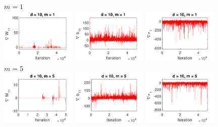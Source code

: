 \documentclass[10pt]{article}
\begin{document}
\begin{figure}[p!]
\centering
$m=1$ \\
\includegraphics[width=0.32\textwidth,trim={0 23 0 11.5},clip]{images/bananaND_usivi_gW11_d10_m1.pdf}
\includegraphics[width=0.32\textwidth,trim={0 23 0 11.5},clip]{images/bananaND_usivi_gb11_d10_m1.pdf}
\includegraphics[width=0.32\textwidth,trim={0 23 0 11.5},clip]{images/bananaND_usivi_gsigma1_d10_m1.pdf}
\\
$m=5$ \\
\includegraphics[width=0.32\textwidth,trim={0 23 0 11.5},clip]{images/bananaND_usivi_gW11_d10_m5.pdf}
\includegraphics[width=0.32\textwidth,trim={0 23 0 11.5},clip]{images/bananaND_usivi_gb11_d10_m5.pdf}
\includegraphics[width=0.32\textwidth,trim={0 23 0 11.5},clip]{images/bananaND_usivi_gsigma1_d10_m5.pdf}

\end{figure}
\end{document}
